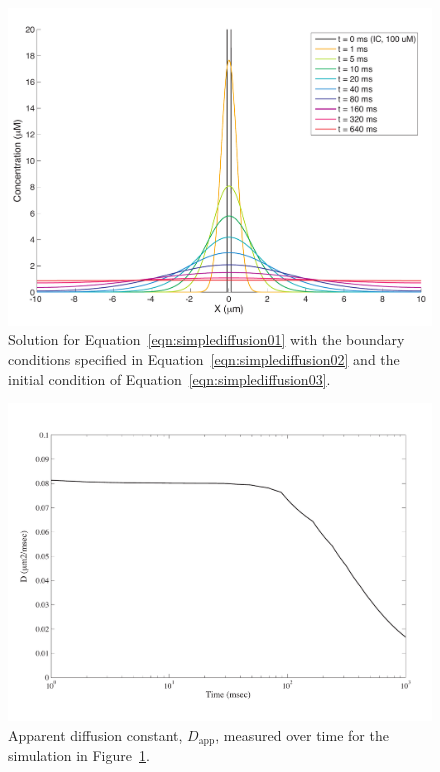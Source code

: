 \documentclass[a4paper,12pt]{book}
\begin{document}
\begin{figure}
\centering
\includegraphics[width=13cm]{simplediffusion01.pdf}
\caption{Solution for Equation~\ref{eqn:simplediffusion01} with the boundary conditions specified in Equation~\ref{eqn:simplediffusion02} and the initial condition of Equation~\ref{eqn:simplediffusion03}.}
\label{fig:simplediffusion01}
\end{figure}

\begin{figure}
\centering
\includegraphics[width=13cm]{simplediffusion02.pdf}
\caption{Apparent diffusion constant, $D_\text{app}$, measured over time for the simulation in Figure~\ref{fig:simplediffusion01}.}
\label{fig:simplediffusion02}
\end{figure}
\end{document}
